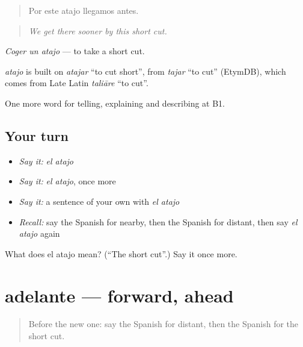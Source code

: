 \begin{quote}
Por este atajo llegamos antes.
\end{quote}

\begin{quote}
\emph{We get there sooner by this short cut.}
\end{quote}

\emph{Coger un atajo} — to take a short cut.

\begin{cousinweb}
\emph{atajo} is built on \emph{atajar} \textquotedblleft{}to cut short\textquotedblright{}, from \emph{tajar} \textquotedblleft{}to cut\textquotedblright{} (EtymDB), which comes from Late Latin \emph{taliāre} \textquotedblleft{}to cut\textquotedblright{}.
\end{cousinweb}

\begin{grammarlens}[title={What you've built}]
One more word for telling, explaining and describing at B1.
\end{grammarlens}

\subsection*{Your turn}
\begin{itemize}
\raggedright
  \item \emph{Say it:} \emph{el atajo}
  \item \emph{Say it:} \emph{el atajo}, once more
  \item \emph{Say it:} a sentence of your own with \emph{el atajo}
  \item \emph{Recall:} say the Spanish for nearby, then the Spanish for distant, then say \emph{el atajo} again
\end{itemize}

\begin{tcolorbox}[breakable,colback=teal!4,colframe=teal!35!black,title={Before you move on}]
What does el atajo mean? (\textquotedblleft{}The short cut\textquotedblright{}.) Say it once more.
\end{tcolorbox}
\section[adelante]{adelante — forward, ahead}

\label{lesson:ES-C671-adelante}



\begin{quote}
Before the new one: say the Spanish for distant, then the Spanish for the short cut.
\end{quote}

